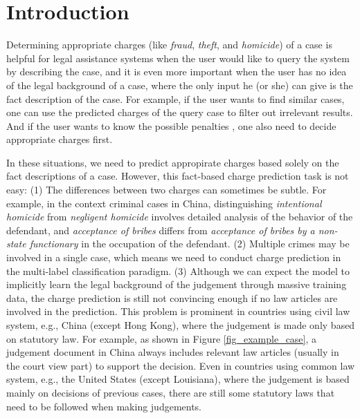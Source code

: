 \section{Introduction}
Determining appropriate charges (like \emph{fraud}, \emph{theft}, and \emph{homicide}) of a case is helpful for legal assistance systems when the user would like to query the system by describing the case, and it is even more important when the user has no idea of the legal background of a case, where the only input he (or she) can give is the fact description of the case. 
For example, if the user wants to find similar cases, one can use the predicted charges of the query case to filter out irrelevant results. And if the user wants to know the possible penalties , one also need to decide appropriate charges first.


In these situations, we need to predict appropirate charges based solely on the fact descriptions of a case. 
However, this fact-based charge prediction task is not easy:
(1) The differences between two charges can sometimes be subtle. For example, in the context criminal cases in China, distinguishing \emph{intentional homicide} from \emph{negligent homicide} involves detailed analysis of the behavior of the defendant, and \emph{acceptance of bribes} differs from \emph{acceptance of bribes by a non-state functionary} in the occupation of the defendant. 
(2) Multiple crimes may be involved in a single case, which means we need to conduct charge prediction in the multi-label classification paradigm. 
(3)  Although we can expect the model to implicitly learn the legal background of the judgement through massive training data, the charge prediction is still not convincing enough if no law articles are involved in the prediction. This problem is prominent in countries using civil law system, e.g., China (except Hong Kong), where the judgement is made only based on statutory law. 
For example, as shown in Figure \ref{fig_example_case}, a judgement document in China always includes relevant law articles (usually in the court view part) to support the decision.  
Even in countries using common law system, e.g., the United States (except Louisiana), where the judgement is based mainly on decisions of previous cases, there are still some statutory laws that need to be followed when making judgements. 


